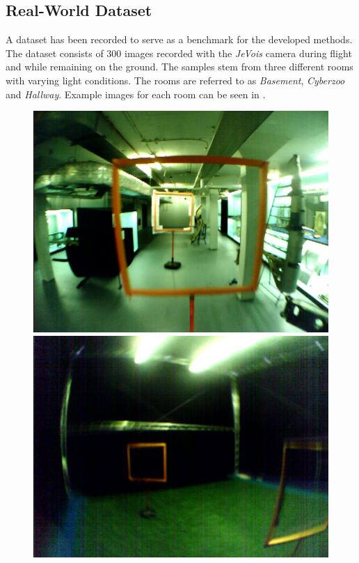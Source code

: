 \subsection{Real-World Dataset}

A dataset has been recorded to serve as a benchmark for the developed methods. The dataset consists of 300 images recorded with the \textit{JeVois} camera during flight and while remaining on the ground. The samples stem from three different rooms with varying light conditions. The rooms are referred to as \textit{Basement}, \textit{Cyberzoo} and \textit{Hallway}. Example images for each room can be seen in .
\begin{figure}
	\centering
	\begin{minipage}{0.3\textwidth}
		\includegraphics[width=\textwidth]{fig/basement}
	\end{minipage}\hfill
	\begin{minipage}{0.3\textwidth}
		\includegraphics[width=\textwidth]{fig/cyberzoo}

\end{minipage}
\end{figure}
